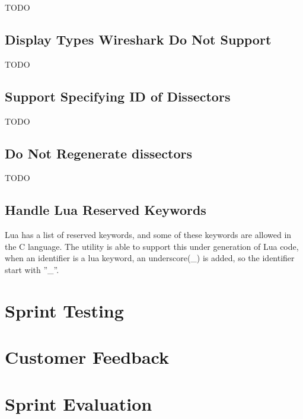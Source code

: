 %

TODO

\subsection{Display Types Wireshark Do Not Support}
TODO

\subsection{Support Specifying ID of Dissectors}
TODO

\subsection{Do Not Regenerate dissectors}
TODO

\subsection{Handle Lua Reserved Keywords}
Lua has a list of reserved keywords, and some of these keywords are allowed in 
the C language. The utility is able to support this under generation of Lua 
code, when an identifier is a lua keyword, an underscore(\_) is added, so the 
identifier start with ''\_''.

\section{Sprint Testing}


\section{Customer Feedback}


\section{Sprint Evaluation}


